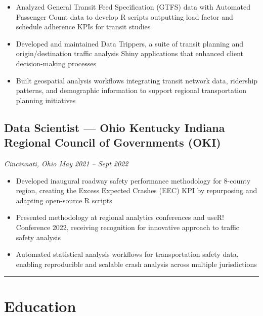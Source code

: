 \documentclass[
  11pt,
]{article}
\begin{document}
\begin{itemize}
\item
  Analyzed General Transit Feed Specification (GTFS) data with Automated
  Passenger Count data to develop R scripts outputting load factor and
  schedule adherence KPIs for transit studies
\item
  Developed and maintained Data Trippers, a suite of transit planning
  and origin/destination traffic analysis Shiny applications that
  enhanced client decision-making processes
\item
  Built geospatial analysis workflows integrating transit network data,
  ridership patterns, and demographic information to support regional
  transportation planning initiatives
\end{itemize}

\hypertarget{data-scientist-ohio-kentucky-indiana-regional-council-of-governments-oki}{%
\subsection{Data Scientist --- Ohio Kentucky Indiana Regional Council of
Governments
(OKI)}\label{data-scientist-ohio-kentucky-indiana-regional-council-of-governments-oki}}

\emph{Cincinnati, Ohio \textbar{} May 2021 -- Sept 2022}

\begin{itemize}
\item
  Developed inaugural roadway safety performance methodology for
  8-county region, creating the Excess Expected Crashes (EEC) KPI by
  repurposing and adapting open-source R scripts
\item
  Presented methodology at regional analytics conferences and useR!
  Conference 2022, receiving recognition for innovative approach to
  traffic safety analysis
\item
  Automated statistical analysis workflows for transportation safety
  data, enabling reproducible and scalable crash analysis across
  multiple jurisdictions
\end{itemize}

\begin{center}\rule{0.5\linewidth}{0.5pt}\end{center}

\hypertarget{education}{%
\section{Education}\label{education}}
\end{document}
